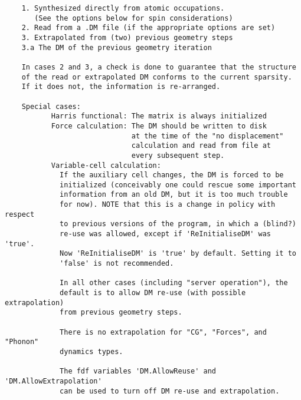 \documentclass[11pt]{article}
\begin{document}
\begin{verbatim}
    1. Synthesized directly from atomic occupations.
       (See the options below for spin considerations)
    2. Read from a .DM file (if the appropriate options are set)
    3. Extrapolated from (two) previous geometry steps
    3.a The DM of the previous geometry iteration

    In cases 2 and 3, a check is done to guarantee that the structure
    of the read or extrapolated DM conforms to the current sparsity.
    If it does not, the information is re-arranged.

    Special cases:
           Harris functional: The matrix is always initialized
           Force calculation: The DM should be written to disk
                              at the time of the "no displacement"
                              calculation and read from file at
                              every subsequent step.
           Variable-cell calculation:
             If the auxiliary cell changes, the DM is forced to be
             initialized (conceivably one could rescue some important
             information from an old DM, but it is too much trouble
             for now). NOTE that this is a change in policy with respect
             to previous versions of the program, in which a (blind?)
             re-use was allowed, except if 'ReInitialiseDM' was 'true'.
             Now 'ReInitialiseDM' is 'true' by default. Setting it to
             'false' is not recommended.

             In all other cases (including "server operation"), the
             default is to allow DM re-use (with possible extrapolation)
             from previous geometry steps.

             There is no extrapolation for "CG", "Forces", and "Phonon"
             dynamics types.

             The fdf variables 'DM.AllowReuse' and 'DM.AllowExtrapolation'
             can be used to turn off DM re-use and extrapolation.

\end{verbatim}
\end{document}
